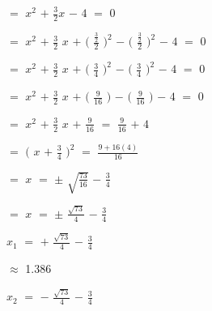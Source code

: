 \documentclass[12pt]{article}
\begin{document}
\hspace{4cm} $=$ $x^{2}$ $+$ {\Large{$\frac{3}{2}$}}$x$ $-$ $4$ $=$ $0$ \vspace{0.5cm}

\hspace{4cm} $=$ $x^{2}$ $+$ {\Large{$\frac{3}{2}$}} $x$ $+$ $\bigg($ {\Large{$\frac{\frac{3}{2}}{2}$}} $\bigg)^{2}$ $-$ $\bigg($ {\Large{$\frac{\frac{3}{2}}{2}$}} $\bigg)^{2}$ $-$ $4$ $=$ $0$ \vspace{0.5cm}

\hspace{4cm} $=$ $x^{2}$ $+$ {\Large{$\frac{3}{2}$}} $x$ $+$ $\bigg($ {\Large{$\frac{3}{4}$}} $\bigg)^{2}$ $-$ $\bigg($ {\Large{$\frac{3}{4}$}} $\bigg)^{2}$ $-$ $4$ $=$ $0$ \vspace{0.5cm}

\hspace{4cm} $=$ $x^{2}$ $+$ {\Large{$\frac{3}{2}$}} $x$ $+$ $\bigg($ {\Large{$\frac{9}{16}$}} $\bigg)$ $-$ $\bigg($ {\Large{$\frac{9}{16}$}} $\bigg)$ $-$ $4$ $=$ $0$ \vspace{0.5cm}

\hspace{4cm} $=$ $x^{2}$ $+$ {\Large{$\frac{3}{2}$}} $x$ $+$  {\Large{$\frac{9}{16}$}}  $=$   {\Large{$\frac{9}{16}$}}  $+$ $4$ \vspace{0.5cm}

\hspace{4cm} $=$ $\big($ $x$ $+$ {\Large{$\frac{3}{4}$}} $\big)^{2}$ $=$ {\Large{$\frac{9 + 16(4)}{16}$}} \vspace{0.5cm}

\hspace{4cm} $=$  $x$ $=$ $\pm$ {\large{$\sqrt{\frac{73}{16}}$}} $-$ {\Large{$\frac{3}{4}$}} \vspace{0.5cm}

\hspace{4cm} $=$  $x$ $=$ $\pm$ {\Large{$\frac{\sqrt{73}}{4}$}} $-$ {\Large{$\frac{3}{4}$}} \vspace{0.5cm}


$x_{1}$ $=$ $+$ {\Large{$\frac{\sqrt{73}}{4}$}} $-$ {\Large{$\frac{3}{4}$}} \vspace{0.5cm}

\hspace{0.4cm} $\approx$ 1.386 \vspace{0.5cm}

$x_{2}$ $=$ $-$ {\Large{$\frac{\sqrt{73}}{4}$}} $-$ {\Large{$\frac{3}{4}$}} \vspace{0.5cm}
\end{document}
